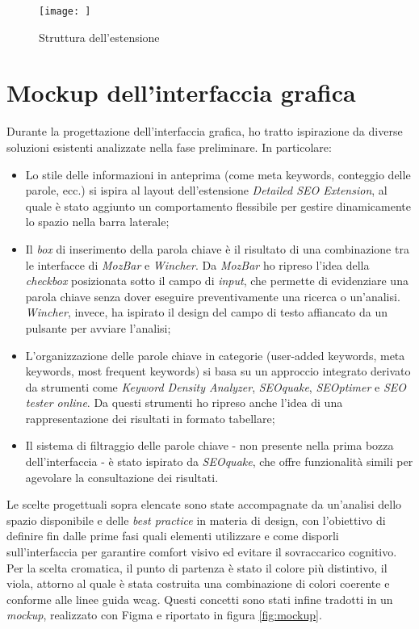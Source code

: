\begin{figure}[H]
  \centering 
  \texttt{[image: ]}
  \caption{Struttura dell'estensione}
  \label{fig:struttura_estensione}
\end{figure}

\section{Mockup dell'interfaccia grafica}
\label{sec:mockup}

\par Durante la progettazione dell’interfaccia grafica, ho tratto ispirazione da diverse soluzioni esistenti analizzate nella fase preliminare. In particolare:
\begin{itemize}
    \item Lo stile delle informazioni in anteprima (come meta keywords, conteggio delle parole, ecc.) si ispira al layout dell’estensione \textit{Detailed SEO Extension}, al quale è stato aggiunto un comportamento flessibile per gestire dinamicamente lo spazio nella barra laterale;
    \item Il \textit{box} di inserimento della parola chiave è il risultato di una combinazione tra le interfacce di \textit{MozBar} e \textit{Wincher}. Da \textit{MozBar} ho ripreso l’idea della \textit{checkbox} posizionata sotto il campo di \textit{input}, che permette di evidenziare una parola chiave senza dover eseguire preventivamente una ricerca o un’analisi. \textit{Wincher}, invece, ha ispirato il design del campo di testo affiancato da un pulsante per avviare l’analisi;
    \item L’organizzazione delle parole chiave in categorie (user-added keywords, meta keywords, most frequent keywords) si basa su un approccio integrato derivato da strumenti come \textit{Keyword Density Analyzer}, \textit{SEOquake}, \textit{SEOptimer} e \textit{SEO tester online}. Da questi strumenti ho ripreso anche l’idea di una rappresentazione dei risultati in formato tabellare;
    \item Il sistema di filtraggio delle parole chiave - non presente nella prima bozza dell’interfaccia - è stato ispirato da \textit{SEOquake}, che offre funzionalità simili per agevolare la consultazione dei risultati.
\end{itemize}

\vspace{5pt}
\par\noindent Le scelte progettuali sopra elencate sono state accompagnate da un’analisi dello spazio disponibile e delle \textit{best practice} in materia di design, con l’obiettivo di definire fin dalle prime fasi quali elementi utilizzare e come disporli sull’interfaccia per garantire comfort visivo ed evitare il sovraccarico cognitivo. Per la scelta cromatica, il punto di partenza è stato il colore più distintivo, il viola, attorno al quale è stata costruita una combinazione di colori coerente e conforme alle linee guida \gls{wcag}. Questi concetti sono stati infine tradotti in un \textit{mockup}, realizzato con Figma e riportato in figura \ref{fig:mockup}.

